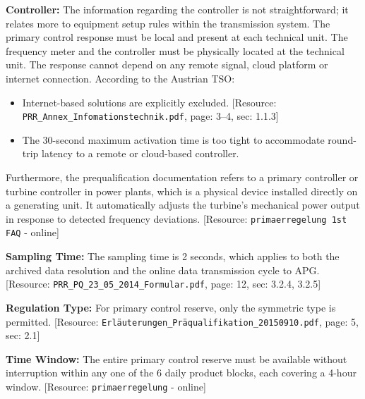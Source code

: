 \textbf{Controller:} The information regarding the controller is not straightforward; it relates more to equipment setup rules within the transmission system. The primary control response must be local and present at each technical unit. The frequency meter and the controller must be physically located at the technical unit. The response cannot depend on any remote signal, cloud platform or internet connection. According to the Austrian TSO:
\begin{itemize}
    \item Internet-based solutions are explicitly excluded. [Resource: \texttt{PRR\_Annex\_Infomationstechnik.pdf}, page: 3--4, sec: 1.1.3]
    \item The 30-second maximum activation time is too tight to accommodate round-trip latency to a remote or cloud-based controller.
\end{itemize}
Furthermore, the prequalification documentation refers to a primary controller or turbine controller in power plants, which is a physical device installed directly on a generating unit. It automatically adjusts the turbine's mechanical power output in response to detected frequency deviations. [Resource: \texttt{primaerregelung 1st FAQ} - online]

\textbf{Sampling Time:} The sampling time is 2 seconds, which applies to both the archived data resolution and the online data transmission cycle to APG. [Resource: \texttt{PRR\_PQ\_23\_05\_2014\_Formular.pdf}, page: 12, sec: 3.2.4, 3.2.5]

\textbf{Regulation Type:} For primary control reserve, only the symmetric type is permitted. [Resource: \texttt{Erläuterungen\_Präqualifikation\_20150910.pdf}, page: 5, sec: 2.1]

\textbf{Time Window:} The entire primary control reserve must be available without interruption within any one of the 6 daily product blocks, each covering a 4-hour window. [Resource: \texttt{primaerregelung} - online]
